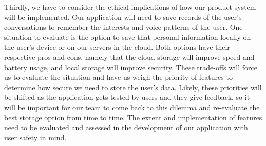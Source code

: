 Thirdly, we have to consider the ethical implications of how our product system will be implemented. Our application will need to save records of the user's conversations to remember the interests and voice patterns of the user. One situation to evaluate is the option to save that personal information locally on the user's device or on our servers in the cloud. Both options have their respective pros and cons, namely that the cloud storage will improve speed and battery usage, and local storage will improve security. These trade-offs will force us to evaluate the situation and have us weigh the priority of features to determine how secure we need to store the user's data. Likely, these priorities will be shifted as the application gets tested by users and they give feedback, so it will be important for our team to come back to this dilemma and re-evaluate the best storage option from time to time. The extent and implementation of features need to be evaluated and assessed in the development of our application with user safety in mind.


%


